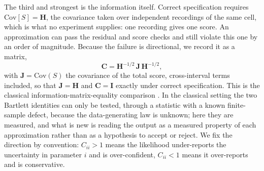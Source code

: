 The third and strongest is the information itself. Correct specification requires $\mathrm{Cov}[S]=\mathbf{H}$, the covariance taken over independent recordings of the same cell, which is what no experiment supplies: one recording gives one score. An approximation can pass the residual and score checks and still violate this one by an order of magnitude. Because the failure is directional, we record it as a matrix,
\[ \mathbf{C}=\mathbf{H}^{-1/2}\,\mathbf{J}\,\mathbf{H}^{-1/2}, \]
with $\mathbf{J}=\mathrm{Cov}(S)$ the covariance of the total score, cross-interval terms included, so that $\mathbf{J}=\mathbf{H}$ and $\mathbf{C}=\mathbf{I}$ exactly under correct specification. This is the classical information-matrix-equality comparison \cite{white1982maximum}. In the classical setting the two Bartlett identities can only be tested, through a statistic with a known finite-sample defect, because the data-generating law is unknown; here they are measured, and what is new is reading the output as a measured property of each approximation rather than as a hypothesis to accept or reject.
We fix the direction by convention: $C_{ii}>1$ means the likelihood under-reports the uncertainty in parameter $i$ and is over-confident, $C_{ii}<1$ means it over-reports and is conservative.


